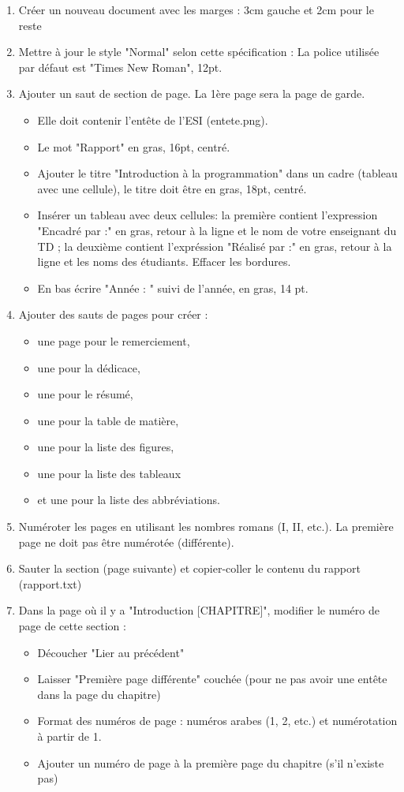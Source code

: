 \documentclass[11pt, a4paper]{article}
\begin{document}
\begin{enumerate}
	\item Créer un nouveau document avec les marges : 3cm gauche et 2cm pour le reste 
	\item Mettre à jour le style "Normal" selon cette spécification : La police utilisée par défaut est "Times New Roman", 12pt.
	\item Ajouter un saut de section de page. La 1ère page sera la page de garde.  
	\begin{itemize}
		\item Elle doit contenir l'entête de l'ESI (entete.png). 
		\item Le mot "Rapport" en gras, 16pt, centré. 
		\item Ajouter le titre "Introduction à la programmation" dans un cadre (tableau avec une cellule), le titre doit être en gras, 18pt, centré. 
		\item Insérer un tableau avec deux cellules: la première contient l'expression "Encadré par :" en gras, retour à la ligne et le nom de votre enseignant du TD ; la deuxième contient l'expréssion "Réalisé par :" en gras, retour à la ligne et les noms des étudiants. Effacer les bordures.
		\item En bas écrire "Année : " suivi de l'année, en gras, 14 pt.
	\end{itemize}

	\item Ajouter des sauts de pages pour créer :  
	\begin{itemize}
		\item une page pour le remerciement, 
		\item une pour la dédicace, 
		\item une pour le résumé, 
		\item une pour la table de matière, 
		\item une pour la liste des figures, 
		\item une pour la liste des tableaux 
		\item et une pour la liste des abbréviations.
	\end{itemize}

	\item Numéroter les pages en utilisant les nombres romans (I, II, etc.). La première page ne doit pas être numérotée (différente).
	\item Sauter la section (page suivante) et copier-coller le contenu du rapport (rapport.txt)
	\item Dans la page où il y a "Introduction [CHAPITRE]", modifier le numéro de page de cette section : 
	\begin{itemize}
		\item Découcher "Lier au précédent" 
		\item Laisser "Première page différente" couchée (pour ne pas avoir une entête dans la page du chapitre) 
		\item Format des numéros de page : numéros arabes (1, 2, etc.) et numérotation à partir de 1.
		\item Ajouter un numéro de page à la première page du chapitre (s'il n'existe pas)
	\end{itemize}
	

\end{enumerate}
\end{document}
